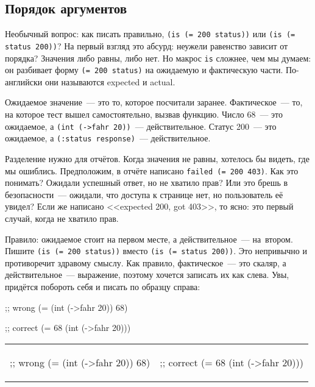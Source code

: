 \subsection{Порядок аргументов}


Необычный вопрос: как писать правильно, \verb|(is (= 200 status))| или
\verb|(is (= status 200))|? На первый взгляд это абсурд: неужели равенство
зависит от порядка? Значения либо равны, либо нет. Но макрос \verb|is|
сложнее, чем мы думаем: он разбивает форму \verb|(= 200 status)| на ожидаемую
и фактическую части. По-английски они называются expected и actual.

Ожидаемое значение~--- это то, которое посчитали заранее. Фактическое~--- то, на которое
тест вышел самостоятельно, вызвав функцию. Число 68~--- это ожидаемое, а
\verb|(int (->fahr 20))|~--- действительное. Статус 200~--- это ожидаемое, а
\verb|(:status response)|~--- действительное.

Разделение нужно для отчётов. Когда значения не равны, хотелось бы видеть, где
мы ошиблись. Предположим, в отчёте написано \verb|failed (= 200 403)|. Как это
понимать? Ожидали успешный ответ, но не хватило прав? Или это брешь в
безопасности~--- ожидали, что доступа к странице нет, но пользователь её увидел?
Если же написано <<expected 200, got 403>>, то ясно: это первый случай, когда
не хватило прав.

Правило: ожидаемое стоит на первом месте, а действительное~--- на~втором. Пишите
\verb|(is (= 200 status))| вместо \verb|(is (= status 200))|.
Это непривычно и противоречит здравому смыслу. Как правило, фактическое~---
это скаляр, а действительное~--- выражение, поэтому хочется записать их как слева.
Увы, придётся побороть себя и писать по образцу справа:

\ifx\devicetype\mobile

\begin{english}
  \begin{clojure}
;; wrong
(= (int (->fahr 20)) 68)
  \end{clojure}

\splitter

  \begin{clojure}
;; correct
(= 68 (int (->fahr 20)))
  \end{clojure}
\end{english}

\else

\begin{english}

\noindent
\begin{tabular}{ @{}p{5cm} @{}p{5cm} }

  \begin{clojure}
;; wrong
(= (int (->fahr 20)) 68)
  \end{clojure}

&

  \begin{clojure}
;; correct
(= 68 (int (->fahr 20)))
  \end{clojure}

\end{tabular}

\end{english}

